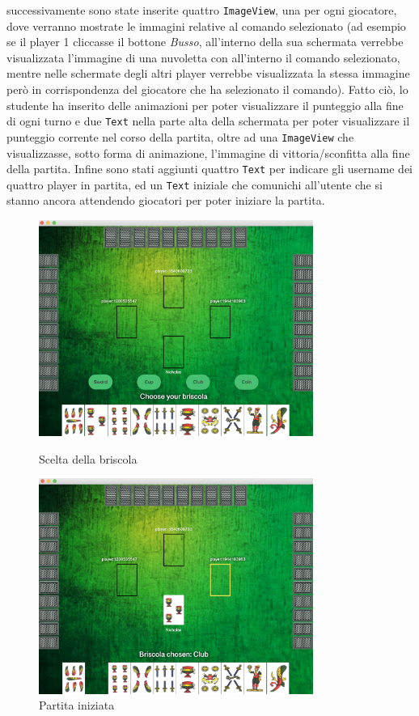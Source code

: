 \begin{itemize}
successivamente sono state inserite quattro \texttt{ImageView}, una per ogni giocatore, dove verranno mostrate le immagini relative al comando selezionato (ad esempio se il player 1 cliccasse il bottone \textit{Busso}, all'interno della sua schermata verrebbe visualizzata l'immagine di una nuvoletta con all'interno il comando selezionato, mentre nelle schermate degli altri player verrebbe visualizzata la stessa immagine però in corrispondenza del giocatore che ha selezionato il comando). Fatto ciò, lo studente ha inserito delle animazioni per poter visualizzare il punteggio alla fine di ogni turno e due \texttt{Text} nella parte alta della schermata per poter visualizzare il punteggio corrente nel corso della partita, oltre ad una \texttt{ImageView} che visualizzasse, sotto forma di animazione, l'immagine di vittoria/sconfitta alla fine della partita. Infine sono stati aggiunti quattro \texttt{Text} per indicare gli username dei quattro player in partita, ed un \texttt{Text} iniziale che comunichi all'utente che si stanno ancora attendendo giocatori per poter iniziare la partita.

	\clearpage

	\begin{figure}[h!]
  	\centering
   	 \includegraphics[width=0.8\textwidth]{playGameView1.png}
    	\caption{Scelta della briscola}
   	 \includegraphics[width=0.8\textwidth]{playGameView2.png}
 	 \caption{Partita iniziata}
	\end{figure}

	\end{itemize}

